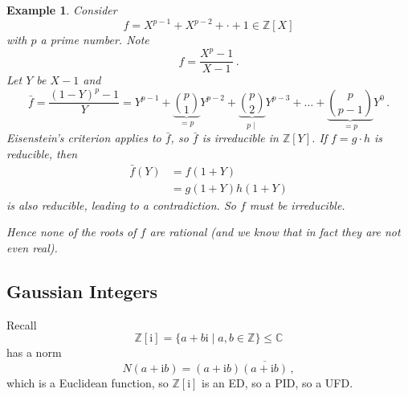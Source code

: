 \documentclass{article}
\theoremstyle{plain}\theoremheaderfont{\normalfont\itshape}\theorembodyfont{\rmfamily}\theoremseparator{.}\newtheorem*{rem}{Remark}\newtheorem*{ex}{Example}\newtheorem*{proof}{Proof}\newtheorem*{altp}{Alternative proof}\newtheorem*{nonex}{Non-Example}
\theoremstyle{plain}\theoremheaderfont{\normalfont\bfseries}\theorembodyfont{\rmfamily}\theoremseparator{.}\newtheorem{thm}{Theorem}[section]\newtheorem{lem}[thm]{Lemma}\newtheorem{prop}[thm]{Proposition}\newtheorem*{cor}{Corollary}\newtheorem{defn}[thm]{Definition}\newtheorem{clm}[thm]{Claim}\newtheorem{clminproof}{Claim}\newtheorem*{notn}{Notation}\newtheorem*{exer}{Exercise}\newtheorem*{lemnn}{Lemma}
\theoremstyle{break}\theoremheaderfont{\normalfont\itshape}\theorembodyfont{\rmfamily}\theoremseparator{.\medskip}\newtheorem*{proofskip}{Proof}\newtheorem*{exs}{Examples}\newtheorem*{rems}{Remarks}\newtheorem*{obs}{Observations}
\theoremstyle{break}\theoremheaderfont{\normalfont\bfseries}\theorembodyfont{\rmfamily}\theoremseparator{.\medskip}\newtheorem{lemskip}[thm]{Lemma}\newtheorem{defnskip}[thm]{Definition}\newtheorem{propskip}[thm]{Proposition}\newtheorem{thmskip}[thm]{Theorem}
\numberwithin{equation}{section}
\newcommand{\ii}{\mathrm{i}}
\newcommand{\ZZ}{\mathbb{Z}}
\newcommand{\CC}{\mathbb{C}}
\begin{document}
    \begin{ex}
        Consider
        \[f=X^{p-1}+X^{p-2}+\cdot +1\in\ZZ[X]\]
        with \(p\) a prime number. Note
        \[f=\frac{X^p-1}{X-1}\,.\]
        Let \(Y\) be \(X-1\) and
        \[\bar{f}=\frac{(1-Y)^p-1}{Y}=Y^{p-1}+\underbrace{\binom{p}{1}}_{=p}Y^{p-2}+\underbrace{\binom{p}{2}}_{p\mid}Y^{p-3}+\dots +\underbrace{\binom{p}{p-1}}_{=p}Y^0\,.\]
        Eisenstein's criterion applies to \(\bar{f}\), so \(\bar{f}\) is irreducible in \(\ZZ[Y]\). If \(f=g\cdot h\) is reducible, then
        \begin{align*}
            \bar{f}(Y)&=f(1+Y)\\
            &=g(1+Y)h(1+Y)
        \end{align*}
        is also reducible, leading to a contradiction. So \(f\) must be irreducible.

        Hence none of the roots of \(f\) are rational (and we know that in fact they are not even real).
    \end{ex}
    \subsection{Gaussian Integers}
    Recall
    \[\ZZ[\ii]=\{a+b\ii\mid a,b\in\ZZ\}\le\CC\]
    has a norm
    \[N(a+\ii b)=(a+\ii b)\overline{(a+\ii b)}\,,\]
    which is a Euclidean function, so \(\ZZ[\ii]\) is an ED, so a PID, so a UFD.
\end{document}
